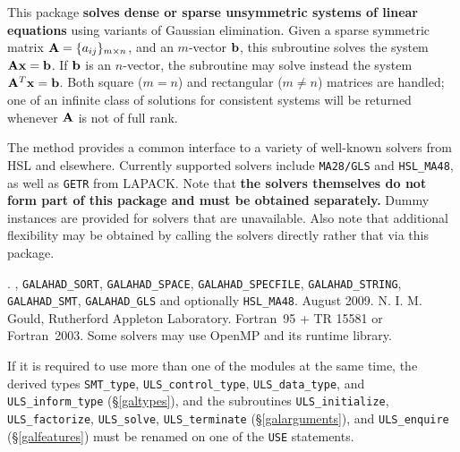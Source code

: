 \documentclass{galahad}
\newcommand{\packagename}{ULS}
\newcommand{\fullpackagename}{\libraryname\_\-\packagename}
\begin{document}
\galheader


\galsummary

This package
{\bf solves dense or sparse unsymmetric systems of linear equations}
using variants of Gaussian elimination.
Given a sparse symmetric matrix ${\mathbf{A}} = \{ a_{ij} \}_{m \times n}$, and an
$m$-vector ${\mathbf{b}}$, this subroutine solves the system ${\mathbf{A}} {\mathbf{x}} = {\mathbf{b}}$.
If ${\mathbf{b}}$ is an $n$-vector, the subroutine may solve instead the system 
${\mathbf{A}}^T {\mathbf{x}} = {\mathbf{b}}$. Both square ($m=n$) and
rectangular ($m\neq n$)  matrices are handled; one of an infinite
class of  solutions for consistent systems will be returned
whenever ${\mathbf{A}}$ is not of full rank.

\noindent The method provides a common interface to a variety of well-known
solvers from HSL and elsewhere.
Currently supported solvers include
{\tt MA28/GLS} and {\tt HSL\_MA48},
as well as {\tt GETR} from LAPACK.
Note that
{\bf the solvers themselves do not form part of this package and must be obtained
separately.} Dummy instances are provided for solvers that are unavailable.
Also note that additional flexibility may be obtained by calling the
solvers directly rather that via this package.


\galattributes
\galversions{\tt  \fullpackagename\_single, \fullpackagename\_double}.
,
{\tt GALAHAD\_\-SORT},
{\tt GALAHAD\_SPACE},
{\tt GALAHAD\_SPECFILE},
{\tt GALAHAD\_STRING},
{\tt GALAHAD\_SMT},
{\tt GALAHAD\_GLS}
and optionally
{\tt HSL\_\-MA48}.
\galdate August 2009.
\galorigin N. I. M. Gould, Rutherford Appleton Laboratory.
\gallanguage Fortran~95 + TR 15581 or Fortran~2003.
\galparallelism Some solvers may use OpenMP and its runtime library.


\galhowto



\noindent
If it is required to use more than one of the modules at the same time, 
the derived types
{\tt SMT\_type},
{\tt \packagename\_control\_type},
{\tt \packagename\_data\-\_type}, and
{\tt \packagename\_inform\_type}
(\S\ref{galtypes}),
and the subroutines
{\tt \packagename\_initialize},
{\tt \packagename\_factorize},
{\tt \packagename\_solve},
{\tt \packagename\_terminate}
(\S\ref{galarguments}),
and
{\tt \packagename\_enquire}
(\S\ref{galfeatures})
must be renamed on one of the {\tt USE} statements.
\end{document}
